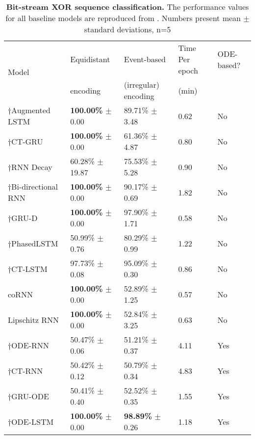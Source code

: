 \documentclass[12pt]{article}
\begin{document}
\begin{table}[t]
    \centering
    \footnotesize
    \caption{\textbf{Bit-stream XOR sequence classification.} The performance values for all baseline models are reproduced from \cite{lechner2020learning}. Numbers present mean $\pm$ standard deviations, n=5}
    \begin{tabular}{lllll}
    \toprule
        \multirow{2}{*}{Model} & Equidistant & Event-based & Time Per epoch  & ODE-based? \\
                               & encoding  & (irregular) encoding & (min) & \\
        \hline
        $\dagger$Augmented LSTM \cite{hochreiter1997long} & \textbf{100.00\%} $\pm$ 0.00 & 89.71\% $\pm$ 3.48 & 0.62 & No\\
        $\dagger$CT-GRU \cite{mozer2017discrete} & \textbf{100.00\%} $\pm$ 0.00 & 61.36\% $\pm$ 4.87 & 0.80 & No \\
        $\dagger$RNN Decay \cite{rubanova2019latent} & 60.28\% $\pm$ 19.87 & 75.53\% $\pm$ 5.28 & 0.90 & No \\
        $\dagger$Bi-directional RNN \cite{schuster1997bidirectional}  & \textbf{100.00\%} $\pm$ 0.00 & 90.17\% $\pm$ 0.69 & 1.82 & No \\
        $\dagger$GRU-D \cite{che2018recurrent} & \textbf{100.00\%} $\pm$ 0.00 & 97.90\% $\pm$ 1.71 & 0.58 & No \\
        $\dagger$PhasedLSTM \cite{neil2016phased}  & 50.99\% $\pm$ 0.76 & 80.29\% $\pm$ 0.99 & 1.22 & No \\
        $\dagger$CT-LSTM \cite{mei2017neural} & 97.73\% $\pm$ 0.08 & 95.09\% $\pm$ 0.30 & 0.86 & No \\
        coRNN \cite{rusch2021coupled} & \textbf{100.00\%} $\pm$ 0.00 & 52.89\% $\pm$ 1.25 & 0.57 & No \\
        Lipschitz RNN \cite{erichson2021lipschitz} & \textbf{100.00\%} $\pm$ 0.00 & 52.84\% $\pm$ 3.25 & 0.63 & No \\
        $\dagger$ODE-RNN \cite{rubanova2019latent}  & 50.47\% $\pm$ 0.06 & 51.21\% $\pm$ 0.37 & 4.11 & Yes\\
        $\dagger$CT-RNN \cite{funahashi1993approximation} & 50.42\% $\pm$ 0.12 & 50.79\% $\pm$ 0.34 & 4.83 & Yes\\
        $\dagger$GRU-ODE \cite{rubanova2019latent} & 50.41\% $\pm$ 0.40 & 52.52\% $\pm$ 0.35 & 1.55 & Yes \\
        $\dagger$ODE-LSTM \cite{lechner2020learning} & \textbf{100.00\%} $\pm$ 0.00 &
        \textbf{98.89\%} $\pm$ 0.26 & 1.18 & Yes \\

\end{tabular}
\end{table}
\end{document}
